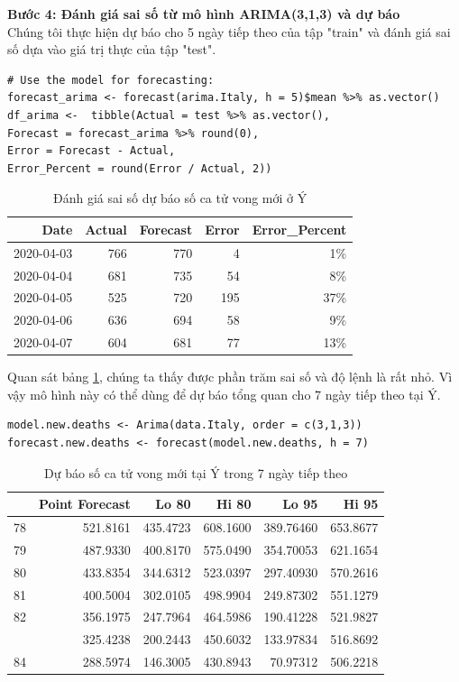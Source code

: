 \documentclass[12pt, a4paper,oneside]{book}
\theoremstyle{definition}
\begin{document}
\textbf{Bước 4: Đánh giá sai số từ mô hình ARIMA(3,1,3) và dự báo}\\
Chúng tôi thực hiện dự báo cho 5 ngày tiếp theo của tập "train" và đánh giá sai số dựa vào giá trị thực của tập "test".
\begin{lstlisting}
# Use the model for forecasting: 
forecast_arima <- forecast(arima.Italy, h = 5)$mean %>% as.vector()
df_arima <-  tibble(Actual = test %>% as.vector(), 
Forecast = forecast_arima %>% round(0), 
Error = Forecast - Actual,
Error_Percent = round(Error / Actual, 2))
\end{lstlisting}
\begin{table}[!h]	
	\caption{Đánh giá sai số dự báo số ca tử vong mới ở Ý}
    \label{Italy}
	\centering
	\fontsize{6}{8}\selectfont
	\begin{tabular}[t]{rrrrr}
		\toprule
		Date & Actual & Forecast & Error & Error\_Percent\\
		\midrule
		\rowcolor{gray!6}  2020-04-03 & 766 & 770 & 4 & 1\%\\
		2020-04-04 & 681 & 735 & 54 & 8\%\\
		\rowcolor{gray!6}  2020-04-05 & 525 & 720 & 195 & 37\%\\
		2020-04-06 & 636 & 694 & 58 & 9\%\\
		\rowcolor{gray!6}  2020-04-07 & 604 & 681 & 77 & 13\%\\
		\bottomrule
	\end{tabular}
\end{table}
Quan sát bảng \ref{Italy}, chúng ta thấy được phần trăm sai số và độ lệnh là rất nhỏ. Vì vậy mô hình này có thể dùng để dự báo tổng quan cho 7 ngày tiếp theo tại Ý.
\begin{lstlisting}
model.new.deaths <- Arima(data.Italy, order = c(3,1,3))
forecast.new.deaths <- forecast(model.new.deaths, h = 7)
\end{lstlisting}
\begin{table}[!h]
	\caption{Dự báo số ca tử vong mới tại Ý trong 7 ngày tiếp theo}
	\label{tab:}
	\centering
	\fontsize{6}{8}\selectfont
	\begin{tabular}[t]{lrrrrr}
		\toprule
		& Point Forecast & Lo 80 & Hi 80 & Lo 95 & Hi 95\\
		\midrule
		\rowcolor{gray!6}  78 & 521.8161 & 435.4723 & 608.1600 & 389.76460 & 653.8677\\
		79 & 487.9330 & 400.8170 & 575.0490 & 354.70053 & 621.1654\\
		\rowcolor{gray!6}  80 & 433.8354 & 344.6312 & 523.0397 & 297.40930 & 570.2616\\
		81 & 400.5004 & 302.0105 & 498.9904 & 249.87302 & 551.1279\\
		\rowcolor{gray!6}  82 & 356.1975 & 247.7964 & 464.5986 & 190.41228 & 521.9827\\
		\addlinespace
		83 & 325.4238 & 200.2443 & 450.6032 & 133.97834 & 516.8692\\
		\rowcolor{gray!6}  84 & 288.5974 & 146.3005 & 430.8943 & 70.97312 & 506.2218\\
		\bottomrule
	\end{tabular}
\end{table}
\end{document}
